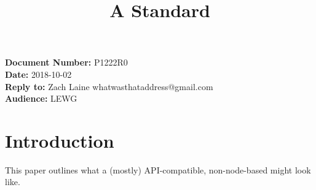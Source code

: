 \documentclass{article}
\begin{document}
\title{\textbf{\Large A Standard }}
\date{}
{\let\newpage\relax\maketitle}

\noindent\textbf{Document Number:} P1222R0\\
\textbf{Date:} 2018-10-02\\
\textbf{Reply to:} Zach Laine whatwasthataddress@gmail.com\\
\textbf{Audience:} LEWG

\section{Introduction}

\label{sec:intro}

This paper outlines what a (mostly) API-compatible, non-node-based 
might look like.



\end{document}
